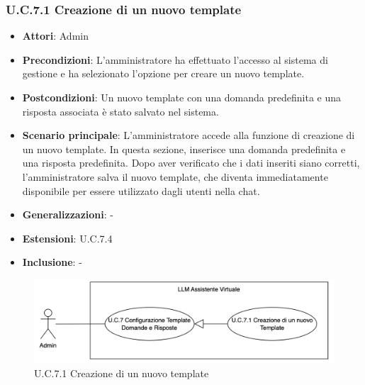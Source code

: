 \subsubsection{U.C.7.1 Creazione di un nuovo template}
\begin{itemize}
    \item \textbf{Attori}: Admin
    \item \textbf{Precondizioni}: L'amministratore ha effettuato l'accesso al sistema di gestione e ha selezionato l'opzione per creare un nuovo template.
    \item \textbf{Postcondizioni}: Un nuovo template con una domanda predefinita e una risposta associata è stato salvato nel sistema.
    \item \textbf{Scenario principale}: L'amministratore accede alla funzione di creazione di un nuovo template. In questa sezione, inserisce una domanda predefinita e una risposta predefinita. Dopo aver verificato che i dati inseriti siano corretti, l'amministratore salva il nuovo template, che diventa immediatamente disponibile per essere utilizzato dagli utenti nella chat.
    \item \textbf{Generalizzazioni}: -
    \item \textbf{Estensioni}: U.C.7.4
    \item \textbf{Inclusione}: -
\end{itemize}
\begin{figure}[H]
    \centering
    \includegraphics[width=\textwidth]{img/U.C.7.1.png}
    \caption{U.C.7.1 Creazione di un nuovo template}
\end{figure}
\newpage
